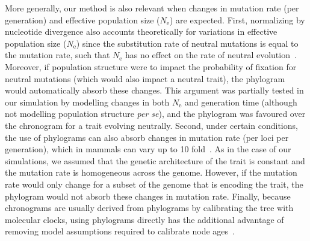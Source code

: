 \documentclass{article}
\newcommand{\Ne}{N_{\text{e}}}
\begin{document}
More generally, our method is also relevant when changes in mutation rate (per generation) and effective population size ($\Ne$) are expected.
First, normalizing by nucleotide divergence also accounts theoretically for variations in effective population size ($\Ne$) since the substitution rate of neutral mutations is equal to the mutation rate, such that $\Ne$ has no effect on the rate of neutral evolution~\citep{kimura_evolutionary_1968, ohta_population_1972}.
Moreover, if population structure were to impact the probability of fixation for neutral mutations (which would also impact a neutral trait), the phylogram would automatically absorb these changes.
This argument was partially tested in our simulation by modelling changes in both $\Ne$ and generation time (although not modelling population structure \textit{per se}), and the phylogram was favoured over the chronogram for a trait evolving neutrally.
Second, under certain conditions, the use of phylograms can also absorb changes in mutation rate (per loci per generation), which in mammals can vary up to 10 fold~\citep{bergeron_evolution_2023}.
As in the case of our simulations, we assumed that the genetic architecture of the trait is constant and the mutation rate is homogeneous across the genome.
However, if the mutation rate would only change for a subset of the genome that is encoding the trait, the phylogram would not absorb these changes in mutation rate.
Finally, because chronograms are usually derived from phylograms by calibrating the tree with molecular clocks, using phylograms directly has the additional advantage of removing model assumptions required to calibrate node ages~\citep{litsios_effects_2012}.
\end{document}
